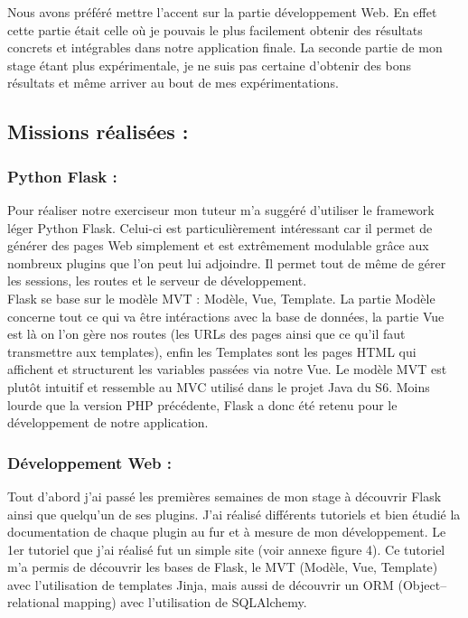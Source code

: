 \documentclass[12pt]{article}
\begin{document}
Nous avons préféré mettre l'accent sur la partie développement Web. En effet cette partie était celle où je pouvais le plus facilement obtenir des résultats concrets et intégrables dans notre application finale. La seconde partie de mon stage étant plus expérimentale, je ne suis pas certaine d'obtenir des bons résultats et même arriver au bout de mes expérimentations.  

\subsection{Missions réalisées :}
\subsubsection{Python Flask :}
Pour réaliser notre exerciseur mon tuteur m’a suggéré d’utiliser le framework léger Python Flask. Celui-ci est particulièrement intéressant car il permet de générer des pages Web simplement et est extrêmement modulable grâce aux nombreux plugins que l’on peut lui adjoindre. Il permet tout de même de gérer les sessions, les routes et le serveur de développement. \\
Flask se base sur le modèle MVT : Modèle, Vue, Template. La partie Modèle concerne tout ce qui va être intéractions avec la base de données, la partie Vue est là on l'on gère nos routes (les URLs des pages ainsi que ce qu'il faut transmettre aux templates), enfin les Templates sont les pages HTML qui affichent et structurent les variables passées via notre Vue. Le modèle MVT est plutôt intuitif et ressemble au MVC utilisé dans le projet Java du S6. Moins lourde que la version PHP précédente, Flask a donc été retenu pour le développement de notre application.

\subsubsection{Développement Web :}

Tout d’abord j’ai passé les premières semaines de mon stage à découvrir Flask ainsi que quelqu’un de ses plugins. J’ai réalisé différents tutoriels et bien étudié la documentation de chaque plugin au fur et à mesure de mon développement. Le 1er tutoriel que j’ai réalisé fut un simple site (voir annexe figure 4). Ce tutoriel m’a permis de découvrir les bases de Flask, le MVT (Modèle, Vue, Template) avec l’utilisation de templates Jinja, mais aussi de découvrir un ORM (Object–relational mapping) avec l’utilisation de SQLAlchemy. \\
\end{document}
